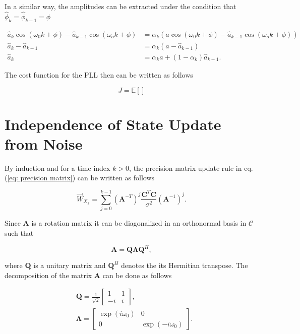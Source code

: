 \documentclass[11pt,a4paper,twoside]{report}
\newcommand{\messF}[3]{\overrightarrow{#1}_{{#2}_{k{#3}}}}
\newcommand{\mat}[1]{\mathbf{#1}}
\begin{document}
In a similar way, the amplitudes can be extracted under the condition that $\hat{\phi}_k = \hat{\phi}_{k-1} = \phi$

\begin{align}
	\hat{a}_k\cos{\left(\omega_0k + \phi\right)} - \hat{a}_{k-1}\cos{\left(\omega_ok + \phi\right)} &= \alpha_k\left(a\cos{\left(\omega_0k + \phi\right)} - \hat{a}_{k-1}\cos{\left(\omega_ok + \phi\right)}\right) \\
	\hat{a}_k - \hat{a}_{k-1} &= \alpha_k\left(a-\hat{a}_{k-1}\right) \\
	\hat{a}_k &= \alpha_ka + \left(1-\alpha_k\right)\hat{a}_{k-1}.
\end{align}

The cost function for the PLL then can be written as follows

\begin{equation}
	J = \mathbb{E}\left[\right]
\end{equation}


\chapter*{Independence of State Update from Noise}
By induction and for a time index $k>0$, the precision matrix update rule in eq. (\ref{eq: precision matrix}) can be written as follows

\begin{equation}
	\label{eq: update rule}
	\messF{W}{X}{} = \sum_{j=0}^{k-1}\left(\mat{A}^{-T}\right)^j\frac{\mat{C}^T\mat{C}}{\sigma^2}\left(\mat{A}^{-1}\right)^{j}.
\end{equation}

Since $\mat{A}$ is a rotation matrix it can be diagonalized in an orthonormal basis in $\mathcal{C}$ such that

\begin{equation}
	\mat{A} = \mat{Q\Lambda}\mat{Q}^H,
\end{equation}

where $\mat{Q}$ is a unitary matrix and $\mat{Q}^H$ denotes the its Hermitian transpose. The decomposition of the matrix $\mat{A}$ can be done as follows

\begin{align*}
	&\mat{Q} = \frac{1}{\sqrt{2}}
		\begin{bmatrix}
			1 & 1 \\
			-i & i
		\end{bmatrix},
	\\
	&\mat{\Lambda} = 
		\begin{bmatrix}
			\exp{(i\omega_0)} & 0 \\
			0 & \exp{(-i\omega_0)}
		\end{bmatrix}.
\end{align*}
\end{document}

